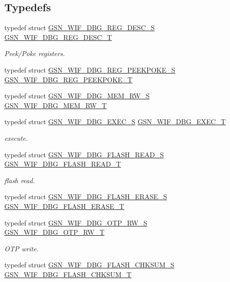 \subsection*{Typedefs}
\begin{DoxyCompactItemize}
\item 
typedef struct \hyperlink{a00333}{GSN\_\-WIF\_\-DBG\_\-REG\_\-DESC\_\-S} \hyperlink{a00637_ga50b90f67a85a905f110ae0541038a9df}{GSN\_\-WIF\_\-DBG\_\-REG\_\-DESC\_\-T}
\begin{DoxyCompactList}\small\item\em Peek/Poke registers. \end{DoxyCompactList}\item 
typedef struct \hyperlink{a00334}{GSN\_\-WIF\_\-DBG\_\-REG\_\-PEEKPOKE\_\-S} \hyperlink{a00609_ab69f8b4406cd0f30cbc9ea70450add1d}{GSN\_\-WIF\_\-DBG\_\-REG\_\-PEEKPOKE\_\-T}
\item 
typedef struct \hyperlink{a00331}{GSN\_\-WIF\_\-DBG\_\-MEM\_\-RW\_\-S} \hyperlink{a00637_ga3d7095f984e87958477ef9fc29b5f1cb}{GSN\_\-WIF\_\-DBG\_\-MEM\_\-RW\_\-T}
\item 
typedef struct \hyperlink{a00326}{GSN\_\-WIF\_\-DBG\_\-EXEC\_\-S} \hyperlink{a00637_ga0274185c1f8a4b9afb38a595ca615405}{GSN\_\-WIF\_\-DBG\_\-EXEC\_\-T}
\begin{DoxyCompactList}\small\item\em execute. \end{DoxyCompactList}\item 
typedef struct \hyperlink{a00330}{GSN\_\-WIF\_\-DBG\_\-FLASH\_\-READ\_\-S} \hyperlink{a00637_ga0f81223d9a8c224971d75ecd9be0abbe}{GSN\_\-WIF\_\-DBG\_\-FLASH\_\-READ\_\-T}
\begin{DoxyCompactList}\small\item\em flash read. \end{DoxyCompactList}\item 
typedef struct \hyperlink{a00329}{GSN\_\-WIF\_\-DBG\_\-FLASH\_\-ERASE\_\-S} \hyperlink{a00637_ga04e72a38064f50785b2adee075bde99b}{GSN\_\-WIF\_\-DBG\_\-FLASH\_\-ERASE\_\-T}
\item 
typedef struct \hyperlink{a00332}{GSN\_\-WIF\_\-DBG\_\-OTP\_\-RW\_\-S} \hyperlink{a00637_ga473dfdb8d324eb53e02c97fb0afb35d0}{GSN\_\-WIF\_\-DBG\_\-OTP\_\-RW\_\-T}
\begin{DoxyCompactList}\small\item\em OTP write. \end{DoxyCompactList}\item 
typedef struct \hyperlink{a00327}{GSN\_\-WIF\_\-DBG\_\-FLASH\_\-CHKSUM\_\-S} \hyperlink{a00637_gae6d33809d08da1c3b8849bf9c186f2fa}{GSN\_\-WIF\_\-DBG\_\-FLASH\_\-CHKSUM\_\-T}

\end{DoxyCompactItemize}
